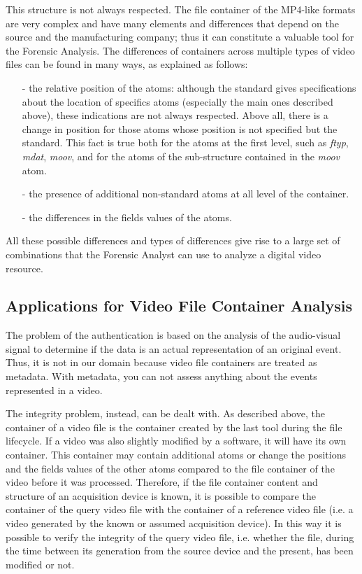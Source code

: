 This structure is not always respected. The file container of the MP4-like formats are very complex and have many elements and differences that depend on the source and the manufacturing company; thus it can constitute a valuable tool for the Forensic Analysis.
The differences of containers across multiple types of video files can be found in many ways, as explained as follows:
\begin{itemize}
\item[-] the relative position of the atoms: although the standard gives specifications about the location of specifics atoms (especially the main ones described above), these indications are not always respected. Above all, there is a change in position for those atoms whose position is not specified but the standard. This fact is true both for the atoms at the first level, such as \emph{ftyp}, \emph{mdat}, \emph{moov}, and for the atoms of the sub-structure contained in the \emph{moov} atom.
\item[-] the presence of additional non-standard atoms at all level of the container.
\item[-] the differences in the fields values of the atoms.
\end{itemize}

All these possible differences and types of differences give rise to a large set of combinations that the Forensic Analyst can use to analyze a digital video resource.

\subsection{Applications for Video File Container Analysis}

The problem of the authentication is based on the analysis of the audio-visual signal to determine if the data is an actual representation of an original event. Thus, it is not in our domain because video file containers are treated as metadata. With metadata, you can not assess anything about the events represented in a video.

The integrity problem, instead, can be dealt with. As described above, the container of a video file is the container created by the last tool during the file lifecycle. If a video was also slightly modified by a software, it will have its own container. This container may contain additional atoms or change the positions and the fields values of the other atoms compared to the file container of the video before it was processed. Therefore, if the file container content and structure of an acquisition device is known, it is possible to compare the container of the query video file with the container of a reference video file (i.e. a video generated by the known or assumed acquisition device). In this way it is possible to verify the integrity of the query video file, i.e. whether the file, during the time between its generation from the source device and the present, has been modified or not.

